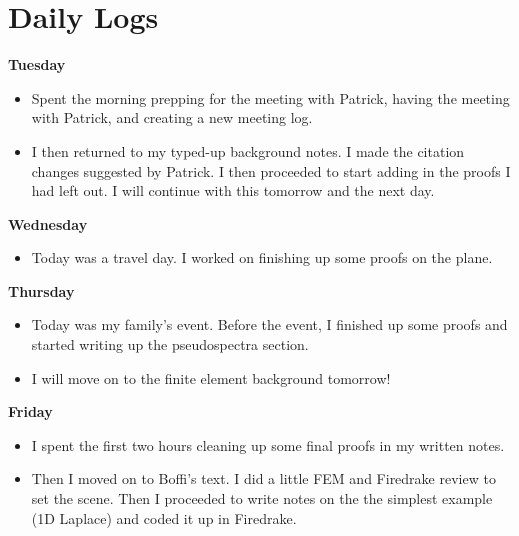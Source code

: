 \documentclass[12pt,a4paper]{article}
\begin{document}
\section{Daily Logs}

\textbf{Tuesday} 

\begin{itemize}
    \item Spent the morning prepping for the meeting with Patrick, having the meeting with Patrick, and creating a new meeting log.
    \item I then returned to my typed-up background notes. I made the citation changes suggested by Patrick. I then proceeded to start adding in the proofs I had left out. I will continue with this tomorrow and the next day. 
\end{itemize}

\textbf{Wednesday} 

\begin{itemize}

    \item Today was a travel day. I worked on finishing up some proofs on the plane. 
\end{itemize}



\textbf{Thursday} 

\begin{itemize}
    \item Today was my family's event. Before the event, I finished up some proofs and started writing up the pseudospectra section.
    \item I will move on to the finite element background tomorrow!
\end{itemize}

\textbf{Friday}

\begin{itemize}
    \item I spent the  first two hours cleaning up some final proofs in my written notes.
    \item Then I moved on to Boffi's text. I did a little FEM and Firedrake review to set the scene. Then I proceeded to write notes on the the simplest example (1D Laplace) and coded it up in Firedrake. 
\end{itemize}
    
\end{document}
